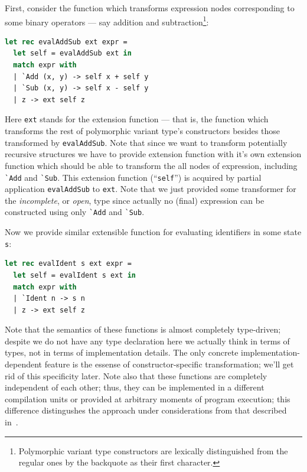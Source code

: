 First, consider the function which transforms expression nodes corresponding to some binary 
operators --- say addition and subtraction\footnote{Polymorphic variant type constructors are 
lexically distinguished from the regular ones by the backquote as their first character.}:

\begin{lstlisting}[language=ocaml]
let rec evalAddSub ext expr =
  let self = evalAddSub ext in
  match expr with
  | `Add (x, y) -> self x + self y
  | `Sub (x, y) -> self x - self y
  | z -> ext self z
\end{lstlisting}

Here \lstinline{ext} stands for the extension function --- that is, the function which
transforms the rest of polymorphic variant type's constructors besides those transformed 
by \lstinline{evalAddSub}. Note that since we want to transform potentially recursive 
structures we have to provide extension function with it's own extension function which 
should be able to transform the all nodes of expression, including \lstinline{`Add} and
\lstinline{`Sub}. This extension function (``\lstinline{self}'') is acquired by partial
application \lstinline{evalAddSub} to \lstinline{ext}. Note that we just provided some 
transformer for the \emph{incomplete}, or \emph{open}, type since actually no (final) 
expression can be constructed using only \lstinline{`Add} and \lstinline{`Sub}. 

Now we provide similar extensible function for evaluating identifiers in some state 
\lstinline{s}:

\begin{lstlisting}[language=ocaml]
let rec evalIdent s ext expr =
  let self = evalIdent s ext in
  match expr with
  | `Ident n -> s n
  | z -> ext self z
\end{lstlisting}

Note that the semantics of these functions is almost completely type-driven; despite
we do not have any type declaration here we actually think in terms of types, not
in terms of implementation details. The only concrete implementation-dependent feature
is the essense of constructor-specific transformation; we'll get rid of this specificity 
later. Note also that these functions are completely independent of each other; thus, they 
can be implemented in a different compilation units or provided at arbitrary moments of 
program execution; this difference distingushes the approach under considerations from that 
described in~\cite{PVReuse}.

